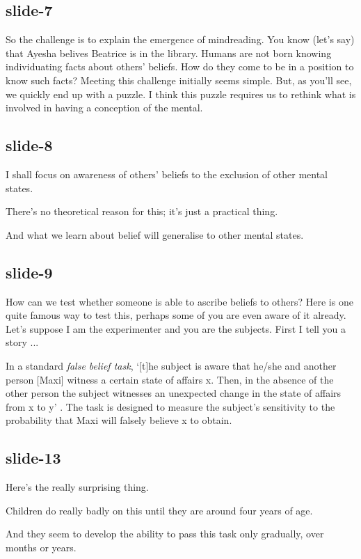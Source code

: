 \documentclass[12pt,\papersize]{extarticle}
\begin{document}
\subsection{slide-7}
So the challenge is to explain the emergence of mindreading.
You know (let's say) that Ayesha belives Beatrice is in the library.
Humans are not born knowing individuating facts about others' beliefs.
How do they come to be in a position to know such facts?
Meeting this challenge initially seems simple.
But, as you'll see, we quickly end up with a puzzle.
I think this puzzle requires us to rethink what is involved in having a conception of
the mental.

\subsection{slide-8}
I shall focus on awareness of others' beliefs to the exclusion of other mental states.

There's no theoretical reason for this; it's just a practical thing.

And what we learn about belief will generalise to other mental states.

\subsection{slide-9}
How can we test whether someone is able to ascribe beliefs to others?
Here is one quite famous way to test this, perhaps some of you are even aware of it
already.
Let's suppose I am the experimenter and you are the subjects.
First I tell you a story ...

In a standard \textit{false belief task}, `[t]he subject is aware that he/she and
another person [Maxi] witness a certain state of affairs x. Then, in the absence of
the other person the subject witnesses an unexpected change in the state of affairs
from x to y' \citep[p.\ 106]{Wimmer:1983dz}. The task is designed to measure the
subject's sensitivity to the probability that Maxi will falsely believe x to obtain.

\subsection{slide-13}
Here's the really surprising thing.

Children do really badly on this until they are around four years of age.

And they seem to develop the ability to pass this task only gradually, over months or years.
\end{document}
